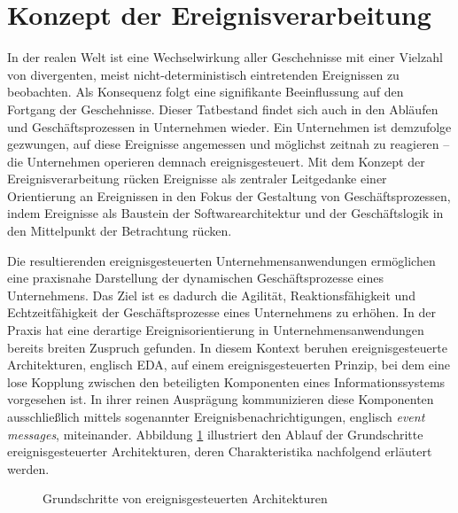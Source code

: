 \section{Konzept der Ereignisverarbeitung}\label{sec:Ereignisverarbeitung}
In der realen Welt ist eine Wechselwirkung aller Geschehnisse mit einer Vielzahl von divergenten, meist nicht-deterministisch eintretenden Ereignissen zu beobachten. Als Konsequenz folgt eine signifikante Beeinflussung auf den Fortgang der Geschehnisse.
\cite{Grauer.2010}
Dieser Tatbestand findet sich auch in den Abläufen und Geschäftsprozessen in Unternehmen wieder.
Ein Unternehmen ist demzufolge gezwungen, auf diese Ereignisse angemessen und möglichst zeitnah zu reagieren – die Unternehmen operieren demnach ereignisgesteuert. 
\cite{Schaaf.2015}
Mit dem Konzept der Ereignisverarbeitung rücken Ereignisse als zentraler Leitgedanke einer Orientierung an Ereignissen in den Fokus der Gestaltung von Geschäftsprozessen, indem Ereignisse als Baustein der Softwarearchitektur und der Geschäftslogik in den Mittelpunkt der Betrachtung rücken. 
\cite{Bruns.2010}

Die resultierenden ereignisgesteuerten Unternehmensanwendungen ermöglichen eine praxisnahe Darstellung der dynamischen Geschäftsprozesse eines Unternehmens. 
Das Ziel ist es dadurch die Agilität, Reaktionsfähigkeit und Echtzeitfähigkeit der Geschäftsprozesse eines Unternehmens zu erhöhen. 
In der Praxis hat eine derartige Ereignisorientierung in Unternehmensanwendungen bereits breiten Zuspruch gefunden. 
\cite{Bruns.2015}
In diesem Kontext beruhen ereignisgesteuerte Architekturen, englisch \ac{EDA}, auf einem ereignisgesteuerten Prinzip, bei dem eine lose Kopplung zwischen den beteiligten Komponenten eines Informationssystems vorgesehen ist.  
In ihrer reinen Ausprägung kommunizieren diese Komponenten ausschließlich mittels sogenannter Ereignisbenachrichtigungen, englisch \textit{event messages}, miteinander.
Abbildung \ref{fig:Grundschritte von ereignisgesteuerten Architekturen} illustriert den Ablauf der Grundschritte ereignisgesteuerter Architekturen, deren Charakteristika nachfolgend erläutert werden.
\cite{Schaaf.2015}

\begin{figure}[H]
	\centering 
    \caption[Grundschritte von ereignisgesteuerten Architekturen]
    {Grundschritte von ereignisgesteuerten Architekturen \protect\footnotemark}
    \label{fig:Grundschritte von ereignisgesteuerten Architekturen}
\end{figure}

